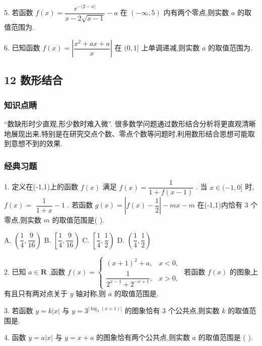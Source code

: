 5. 若函数 $f\left( x\right)  = \dfrac{{{e}}^{-\left| {2 - x}\right| }}{x - 2\sqrt{x - 1}} - a$ 在 $\left( {-\infty ,5}\right)$ 内有两个零点,则实数 $a$ 的取值范围为\blkda{}.

6. 已知函数 $f\left( x\right)  = \left| \dfrac{{x}^{2} + {ax} + a}{x}\right|$ 在 $(0,1\rbrack$ 上单调递减,则实数 $a$ 的取值范围为\blkda{}.

\subsection*{12 数形结合}

\subsubsection*{知识点睛}

“数缺形时少直观,形少数时难入微”. 很多数学问题通过数形结合分析将更直观清晰地展现出来,特别是在研究交点个数、零点个数等问题时,利用数形结合思想可能取到意想不到的效果.

\subsubsection*{经典习题}

1. 定义在(-1,1)上的函数 $f\left( x\right)$ 满足 $f\left( x\right)  = \dfrac{1}{1 + f\left( {x - 1}\right) }$ . 当 $x \in  ( - 1,0\rbrack$ 时, $f\left( x\right)  =$  $\dfrac{1}{1 + x} - 1$ . 若函数 $g\left( x\right)  = \left| {f\left( x\right)  - \dfrac{1}{2}}\right|  - {mx} - m$ 在(-1,1)内恰有 3 个零点,则实数 $m$ 的取值范围是(   ).

A. $\left( {\dfrac{1}{4},\dfrac{9}{16}}\right)$ B. $\left\lbrack  {\dfrac{1}{4},\dfrac{9}{16}}\right)$ C. $\left\lbrack  {\dfrac{1}{4},\dfrac{1}{2}}\right)$ D. $\left( {\dfrac{1}{4},\dfrac{1}{2}}\right)$

2. 已知 $a \in  \mathbf{R}$ ,函数 $f\left( x\right)  = \left\{  \begin{array}{ll} {\left( x + 1\right) }^{2} + a, & x < 0, \\  \dfrac{1}{{2}^{x - 1} + {2}^{-x + 1}}, & x > 0, \end{array}\right.$ 若函数 $f\left( x\right)$ 的图象上有且只有两对点关于 $y$ 轴对称,则 $a$ 的取值范围是\blkda{}.

3. 若函数 $y = k\left| x\right|$ 与 $y = {3}^{\left| {\log }_{3}\left( x + 1\right) \right| }$ 的图象恰有 3 个公共点,则实数 $k$ 的取值范围是\blkda{}.

4. 函数 $y = a\left| x\right|$ 与 $y = x + a$ 的图象恰有两个公共点,则实数 $a$ 的取值范围是 (   ).

